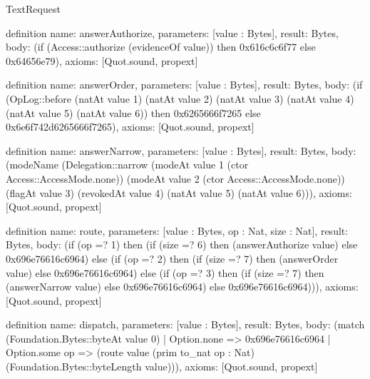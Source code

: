 \begin{lexlean}{TextRequest}
\begin{semanticmodule}
definition{
  name: answerAuthorize,
  parameters: [value : Bytes],
  result: Bytes,
  body: (if (Access::authorize (evidenceOf value)) then 0x616c6c6f77 else 0x64656e79),
  axioms: [Quot.sound, propext]
}

definition{
  name: answerOrder,
  parameters: [value : Bytes],
  result: Bytes,
  body: (if (OpLog::before (natAt value 1) (natAt value 2) (natAt value 3) (natAt value 4) (natAt value 5) (natAt value 6)) then 0x6265666f7265 else 0x6e6f742d6265666f7265),
  axioms: [Quot.sound, propext]
}

definition{
  name: answerNarrow,
  parameters: [value : Bytes],
  result: Bytes,
  body: (modeName (Delegation::narrow (modeAt value 1 (ctor Access::AccessMode.none)) (modeAt value 2 (ctor Access::AccessMode.none)) (flagAt value 3) (revokedAt value 4) (natAt value 5) (natAt value 6))),
  axioms: [Quot.sound, propext]
}

definition{
  name: route,
  parameters: [value : Bytes, op : Nat, size : Nat],
  result: Bytes,
  body: (if (op =? 1) then (if (size =? 6) then (answerAuthorize value) else 0x696e76616c6964) else (if (op =? 2) then (if (size =? 7) then (answerOrder value) else 0x696e76616c6964) else (if (op =? 3) then (if (size =? 7) then (answerNarrow value) else 0x696e76616c6964) else 0x696e76616c6964))),
  axioms: [Quot.sound, propext]
}

definition{
  name: dispatch,
  parameters: [value : Bytes],
  result: Bytes,
  body: (match (Foundation.Bytes::byteAt value 0)
    | Option.none => 0x696e76616c6964
    | Option.some op => (route value (prim to_nat op : Nat) (Foundation.Bytes::byteLength value))),
  axioms: [Quot.sound, propext]
}
\end{semanticmodule}
\end{lexlean}
